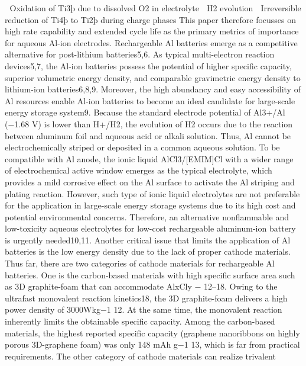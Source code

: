  Oxidation of Ti3þ due to dissolved O2 in electrolyte
 H2 evolution
 Irreversible reduction of Ti4þ to Ti2þ during charge phases 
This paper therefore focusses on high rate capability and extended cycle life as the primary metrics of importance for aqueous Al-ion electrodes.
Rechargeable Al batteries emerge as a competitive alternative for post-lithium batteries5,6. As typical multi-electron reaction devices5,7, the Al-ion batteries possess the potential of higher specific capacity, superior volumetric energy density, and comparable gravimetric energy density to lithium-ion batteries6,8,9. Moreover, the high abundancy and easy
accessibility of Al resources enable Al-ion batteries to become an ideal candidate for large-scale energy storage system9. Because the standard electrode potential of Al3+/Al (−1.68 V) is lower than H+/H2, the evolution of H2 occurs due to the reaction between aluminum foil and aqueous acid or alkali solution. Thus, Al cannot be electrochemically striped or deposited
in a common aqueous solution. To be compatible with Al anode, the ionic liquid AlCl3/[EMIM]Cl with a wider range of electrochemical active window emerges as the typical electrolyte, which provides a mild corrosive effect on the Al surface to activate the Al striping and plating reaction. However, such type of ionic liquid electrolytes are not preferable for the application in large-scale energy storage systems due to its high cost and
potential environmental concerns. Therefore, an alternative nonflammable
and low-toxicity aqueous electrolytes for low-cost rechargeable aluminum-ion battery is urgently needed10,11. Another critical issue that limits the application of Al batteries is the low energy density due to the lack of proper cathode materials. Thus far, there are two categories of cathode materials for rechargeable Al batteries. One is the carbon-based materials
with high specific surface area such as 3D graphite-foam that can accommodate AlxCly − 12–18. Owing to the ultrafast monovalent reaction kinetics18, the 3D graphite-foam delivers a high power density of 3000Wkg−1 12. At the same time, the monovalent reaction inherently limits the obtainable specific capacity. Among the carbon-based materials, the highest reported specific capacity (graphene nanoribbons on highly porous 3D-graphene foam) was only 148 mAh g−1 13, which is far from practical requirements. The other category of cathode materials can realize trivalent
